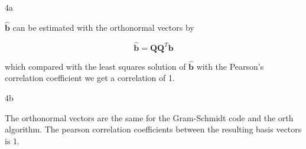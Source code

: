 \documentclass{article}
\begin{document}
\begin{homeworkProblem}

    \begin{homeworkSection}{4a}
        
        $\hat{\bm{b}}$ can be estimated with the orthonormal vectors by

        \begin{equation*}
            \hat{\bm{b}} = \bm{Q}\bm{Q}^T\bm{b}
        \end{equation*}

        \noindent which compared with the least squares solution of
        $\hat{\bm{b}}$ with the Pearson's correlation coefficient we get a
        correlation of 1. 
    
    \end{homeworkSection}

    \begin{homeworkSection}{4b}

        The orthonormal vectors are the same for the Gram-Schmidt code and the
        orth algorithm. The pearson correlation coefficients between the
        resulting basis vectors is 1.

    \end{homeworkSection}

\end{homeworkProblem}
\end{document}
